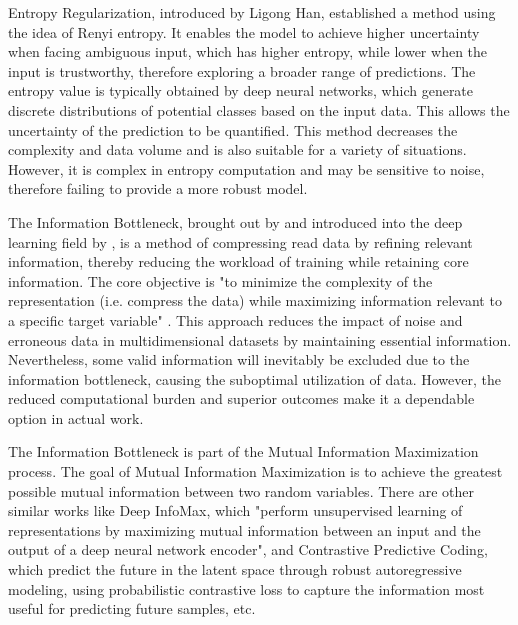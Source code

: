 \documentclass{article}
\begin{document}
Entropy Regularization\cite{han2019unsuperviseddomainadaptationcalibrating}, introduced by Ligong Han, established a method using the idea of Renyi entropy. It enables the model to achieve higher uncertainty when facing ambiguous input, which has higher entropy, while lower when the input is trustworthy, therefore exploring a broader range of predictions. The entropy value is typically obtained by deep neural networks, which generate discrete distributions of potential classes based on the input data. This allows the uncertainty of the prediction to be quantified. This method decreases the complexity and data volume and is also suitable for a variety of situations. However, it is complex in entropy computation and may be sensitive to noise, therefore failing to provide a more robust model.

The Information Bottleneck, brought out by \cite{tishby2000informationbottleneckmethod} and introduced into the deep learning field by \cite{shwartzziv2017openingblackboxdeep},  is a method of compressing read data by refining relevant information, thereby reducing the workload of training while retaining core information. The core objective is "to minimize the complexity of the representation (i.e. compress the data) while maximizing information relevant to a specific target variable" \cite{shwartzziv2023compresscompressselfsupervisedlearning}. This approach reduces the impact of noise and erroneous data in multidimensional datasets by maintaining essential information.  Nevertheless, some valid information will inevitably be excluded due to the information bottleneck, causing the suboptimal utilization of data. However, the reduced computational burden and superior outcomes make it a dependable option in actual work.

The Information Bottleneck is part of the Mutual Information Maximization process. The goal of Mutual Information Maximization is to achieve the greatest possible mutual information between two random variables. There are other similar works like Deep InfoMax\cite{hjelm2019learningdeeprepresentationsmutual},  which "perform unsupervised learning of representations by maximizing mutual information between an input and the output of a deep neural network encoder", and Contrastive Predictive Coding\cite{oord2019representationlearningcontrastivepredictive}, which predict the future in the latent space through robust autoregressive modeling, using probabilistic contrastive loss to capture the information most useful for predicting future samples, etc.
\end{document}
